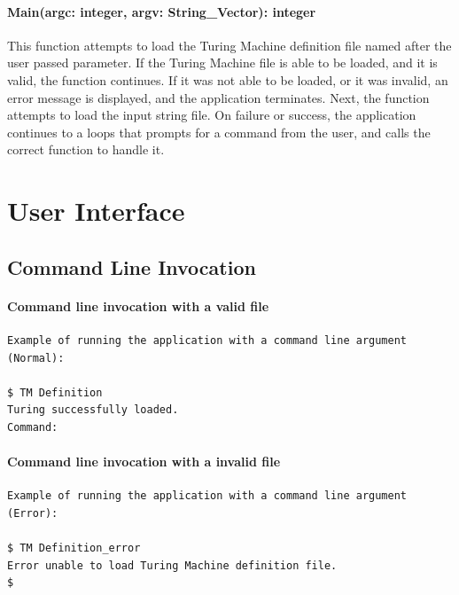 \documentclass{report}
\begin{document}
    \subsubsection{Main(argc: integer, argv: String\_Vector): integer}
    This function attempts to load the Turing Machine definition file named after the user passed parameter. If the Turing Machine file is able to be loaded, and it is valid, the function continues. If it was not able to be loaded, or it was invalid, an error message is displayed, and the application terminates. Next, the function attempts to load the input string file. On failure or success, the application continues to a loops that prompts for a command from the user, and calls the correct function to handle it.


    

    
    

\chapter{User Interface}
     \section{Command Line Invocation}
     
     \subsubsection{Command line invocation with a valid file}
     \begin{verbatim}
Example of running the application with a command line argument (Normal):

$ TM Definition
Turing successfully loaded.
Command:
	\end{verbatim}
    
     \subsubsection{Command line invocation with a invalid file}
     \begin{verbatim}
Example of running the application with a command line argument (Error):

$ TM Definition_error
Error unable to load Turing Machine definition file.
$
	\end{verbatim}
     
\end{document}
